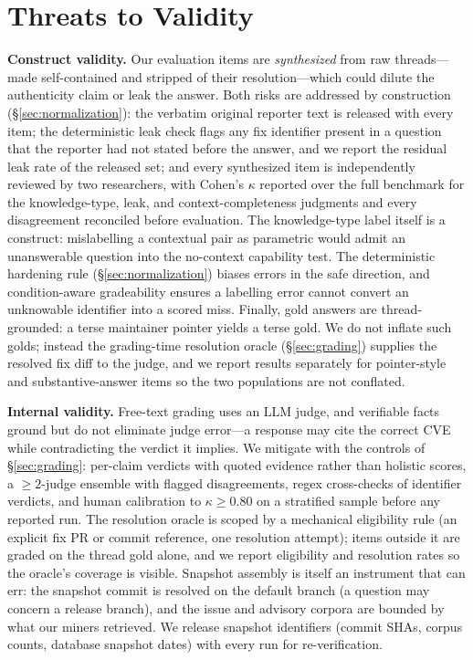 \section{Threats to Validity}
\label{sec:threats}

\noindent\textbf{Construct validity.}
Our evaluation items are \emph{synthesized} from raw threads---made
self-contained and stripped of their resolution---which could dilute the
authenticity claim or leak the answer. Both risks are addressed by construction
(\S\ref{sec:normalization}): the verbatim original reporter text is released
with every item; the deterministic leak check flags any fix identifier
present in a question that the reporter had not stated before the
answer, and we report the residual leak rate of the released set; and every
synthesized item is independently reviewed by two researchers, with Cohen's
$\kappa$ reported over the full benchmark for the knowledge-type, leak, and
context-completeness judgments and every disagreement reconciled before
evaluation. The knowledge-type label itself is a construct: mislabelling a
contextual pair as parametric would admit an unanswerable question into the
no-context capability test. The deterministic hardening rule
(\S\ref{sec:normalization}) biases errors in the safe direction, and
condition-aware gradeability ensures a labelling error cannot
convert an unknowable identifier into a scored miss. Finally, gold answers are
thread-grounded: a terse maintainer pointer yields a terse gold. We do not
inflate such golds; instead the grading-time resolution oracle
(\S\ref{sec:grading}) supplies the resolved fix diff to the judge, and we
report results separately for pointer-style and substantive-answer items so the
two populations are not conflated.

\noindent\textbf{Internal validity.}
Free-text grading uses an LLM judge, and verifiable facts ground but do not eliminate
judge error---a response may cite the correct CVE while contradicting the
verdict it implies. We mitigate with the controls of \S\ref{sec:grading}:
per-claim verdicts with quoted evidence rather than holistic scores, a
$\ge 2$-judge ensemble with flagged disagreements, regex cross-checks of
identifier verdicts, and human calibration to $\kappa \ge 0.80$ on a stratified
sample before any reported run. The resolution oracle is scoped by a mechanical
eligibility rule (an explicit fix PR or commit reference, one resolution
attempt); items outside it are graded on the thread gold alone, and we report
eligibility and resolution rates so the oracle's coverage is visible. Snapshot
assembly is itself an instrument that can err: the snapshot commit is resolved
on the default branch (a question may concern a release branch), and the issue and advisory
corpora are bounded by what our miners retrieved. We release snapshot
identifiers (commit SHAs, corpus counts, database snapshot dates) with every
run for re-verification.


